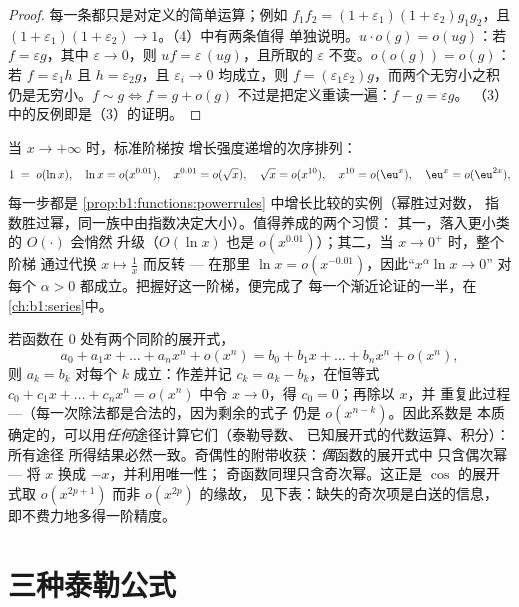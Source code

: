 \begin{proof}
每一条都只是对定义的简单运算；例如
$f_1 f_2 = (1+\varepsilon_1)(1+\varepsilon_2) g_1 g_2$，且 $(1 +
\varepsilon_1)(1+\varepsilon_2) \to 1$。（4）中有两条值得
单独说明。$u\cdot o(g) = o(ug)$：若 $f = \varepsilon g$，其中
$\varepsilon \to 0$，则 $uf = \varepsilon\,(ug)$，且所取的
$\varepsilon$ 不变。$o(o(g)) = o(g)$：若 $f = \varepsilon_1 h$ 且
$h = \varepsilon_2 g$，且 $\varepsilon_i \to 0$ 均成立，则 $f =
(\varepsilon_1\varepsilon_2) g$，而两个无穷小之积
仍是无穷小。$f \sim g \iff f = g +
o(g)$ 不过是把定义重读一遍：$f - g = \varepsilon g$。
（3）中的反例即是（3）的证明。
\end{proof}

\begin{example}[比较阶梯]\label{ex:b1:taylor:scale}
当 $x \to +\infty$ 时，标准阶梯按
增长强度递增的次序排列：
\[
1 \;=\; o(\ln x), \quad
\ln x = o(x^{0.01}), \quad
x^{0.01} = o(\sqrt x), \quad
\sqrt x = o(x^{10}), \quad
x^{10} = o(\eu^{x}), \quad
\eu^x = o(\eu^{2x}) ,
\]
每一步都是
\cref{prop:b1:functions:powerrules} 中增长比较的实例（幂胜过对数，
指数胜过幂，同一族中由指数决定大小）。值得养成的两个习惯：
其一，落入更小类的 $O(\cdot)$ 会悄然
升级（$O(\ln x)$ 也是
$o(x^{0.01})$）；其二，当 $x \to 0^+$ 时，整个阶梯
通过代换 $x \mapsto \frac1x$ 而反转 ---
在那里 $\ln x = o(x^{-0.01})$，因此“$x^\alpha \ln x \to 0$”
对每个 $\alpha > 0$ 都成立。把握好这一阶梯，便完成了
每一个渐近论证的一半，在
\cref{ch:b1:series}中。
\end{example}

\begin{example}[展开式的唯一性与奇偶性的附带收获]\label{ex:b1:taylor:uniqueness}
若函数在 $0$ 处有两个同阶的展开式，
\[
a_0 + a_1 x + \dots + a_n x^n + o(x^n)
= b_0 + b_1 x + \dots + b_n x^n + o(x^n),
\]
则 $a_k = b_k$ 对每个 $k$ 成立：作差并记 $c_k =
a_k - b_k$，在恒等式 $c_0 + c_1 x + \dots + c_n x^n
= o(x^n)$ 中令 $x \to 0$，得 $c_0 = 0$；再除以 $x$，并
重复此过程 ---（每一次除法都是合法的，因为剩余的式子
仍是 $o(x^{n-k})$。因此系数是
本质确定的，可以用\emph{任何}途径计算它们（泰勒导数、
已知展开式的代数运算、积分）：所有途径
所得结果必然一致。奇偶性的附带收获：\emph{偶}函数的展开式中
只含偶次幂 --- 将 $x$ 换成 $-x$，并利用唯一性；
奇函数同理只含奇次幂。这正是
$\cos$ 的展开式取 $o(x^{2p+1})$ 而非 $o(x^{2p})$ 的缘故，
见下表：缺失的奇次项是白送的信息，
即不费力地多得一阶精度。
\end{example}

\section{三种泰勒公式}

